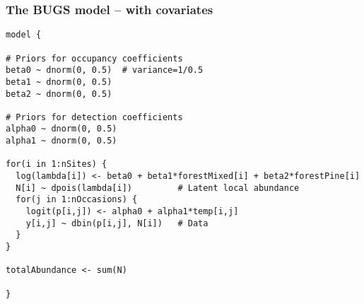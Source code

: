 \documentclass[color=usenames,dvipsnames]{beamer}\usepackage[]{graphicx}\usepackage[]{xcolor}
\makeatletter
\newenvironment{kframe}{%
 \def\at@end@of@kframe{}%
 \ifinner\ifhmode%
  \def\at@end@of@kframe{\end{minipage}}%
  \begin{minipage}{\columnwidth}%
 \fi\fi%
 \def\FrameCommand##1{\hskip\@totalleftmargin \hskip-\fboxsep
 \colorbox{shadecolor}{##1}\hskip-\fboxsep
     \hskip-\linewidth \hskip-\@totalleftmargin \hskip\columnwidth}%
 \MakeFramed {\advance\hsize-\width
   \@totalleftmargin\z@ \linewidth\hsize
   \@setminipage}}%
 {\par\unskip\endMakeFramed%
 \at@end@of@kframe}
\newenvironment{knitrout}{}{} %
\makeatother
\begin{document}
\begin{frame}[fragile]
  \frametitle{The BUGS model -- with covariates}
\begin{knitrout}\scriptsize
{}\color{fgcolor}\begin{kframe}
\begin{verbatim}
model {

# Priors for occupancy coefficients
beta0 ~ dnorm(0, 0.5)  # variance=1/0.5
beta1 ~ dnorm(0, 0.5)
beta2 ~ dnorm(0, 0.5)

# Priors for detection coefficients
alpha0 ~ dnorm(0, 0.5)  
alpha1 ~ dnorm(0, 0.5)

for(i in 1:nSites) {
  log(lambda[i]) <- beta0 + beta1*forestMixed[i] + beta2*forestPine[i]
  N[i] ~ dpois(lambda[i])         # Latent local abundance
  for(j in 1:nOccasions) {
    logit(p[i,j]) <- alpha0 + alpha1*temp[i,j]
    y[i,j] ~ dbin(p[i,j], N[i])   # Data
  }
}

totalAbundance <- sum(N)

}
\end{verbatim}
\end{kframe}
\end{knitrout}

\end{frame}
\end{document}
